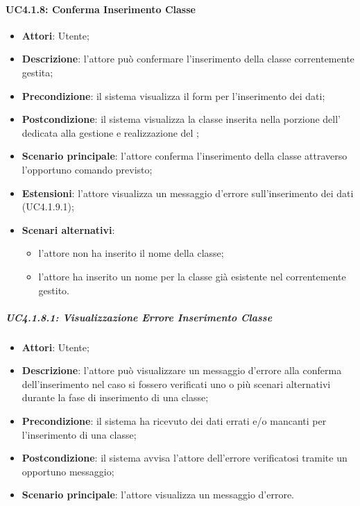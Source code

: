 \paragraph{UC4.1.8: Conferma Inserimento Classe}
\label{UC4.1.8}
\begin{itemize}
\item \textbf{Attori}: Utente;
\item \textbf{Descrizione}: l'attore può confermare l'inserimento della classe correntemente gestita;
\item \textbf{Precondizione}: il sistema visualizza il form per l'inserimento dei dati;	
\item \textbf{Postcondizione}: il sistema visualizza la classe inserita nella porzione dell' dedicata alla gestione e realizzazione del ; 
\item \textbf{Scenario principale}:
l'attore conferma l'inserimento della classe attraverso l'opportuno comando previsto;
\item \textbf{Estensioni}:
l'attore visualizza un messaggio d'errore sull'inserimento dei dati (UC4.1.9.1);
\item \textbf{Scenari alternativi}:
\begin{itemize}
	\item l'attore non ha inserito il nome della classe;
	\item l'attore ha inserito un nome per la classe già esistente nel  correntemente gestito.
\end{itemize}
\end{itemize}

\subparagraph{UC4.1.8.1: Visualizzazione Errore Inserimento Classe}
\label{UC4.1.8.1}
\begin{itemize}
\item \textbf{Attori}: Utente;
\item \textbf{Descrizione}: l'attore può visualizzare un messaggio d'errore alla conferma dell'inserimento nel caso si fossero verificati uno o più scenari alternativi durante la fase di inserimento di una classe;	
\item \textbf{Precondizione}: il sistema ha ricevuto dei dati errati e/o mancanti per l'inserimento di una classe;	
\item \textbf{Postcondizione}: il sistema avvisa l'attore dell'errore verificatosi tramite un opportuno messaggio;	
\item \textbf{Scenario principale}:
l'attore visualizza un messaggio d'errore.	
\end{itemize}

